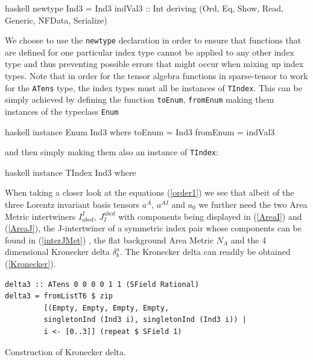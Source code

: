\documentclass[a4paper,12pt, DIV=14, BCOR=5mm, twoside, headsepline, numbers=noenddot]{scrbook}
\begin{document}
\begin{center}
\begin{cminted}{haskell}
newtype Ind3 =  Ind3 {indVal3 :: Int}
    deriving (Ord, Eq, Show, Read, Generic, NFData, Serialize)
\end{cminted}
\end{center}

We choose to use the \texttt{newtype} declaration in order to ensure that functions that are defined for one particular index type cannot be applied to any other index type and thus preventing possible errors that might occur when mixing up index types.
Note that in order for the tensor algebra functions in sparse-tensor to work for the \texttt{ATens} type, the index types must all be instances of \texttt{TIndex}. This can be simply achieved by defining the function \texttt{toEnum}, \texttt{fromEnum} making them instances of the typeclass \texttt{Enum} 

\begin{center}
\begin{cminted}{haskell}
instance Enum Ind3 where
    toEnum = Ind3
    fromEnum = indVal3
\end{cminted} 
\end{center}

and then simply making them also an instance of \texttt{TIndex}:

\begin{center}
\begin{cminted}{haskell}
instance TIndex Ind3 where
\end{cminted} 
\end{center}

When taking a closer look at the equations (\ref{order1}) we see that albeit of the three Lorentz invariant basis tensors $a^{A}$, $a^{AI}$ and $a_0$ we further need the two Area Metric intertwiners $I^I_{abcd}$, $J_I^{abcd}$ with components being displayed in (\ref{AreaI}) and (\ref{AreaJ}), the J-intertwiner of a symmetric index pair whose components can be found in (\ref{interJMet})  , the flat background Area Metric $N_A$ and the 4 dimensional Kronecker delta $\delta^a_b$. 
The Kronecker delta can readily be obtained (\ref{Kronecker}).

\begin{listing}[hbt!]
\begin{verbatim}
delta3 :: ATens 0 0 0 0 1 1 (SField Rational)
delta3 = fromListT6 $ zip
         [(Empty, Empty, Empty, Empty,
         singletonInd (Ind3 i), singletonInd (Ind3 i)) | 
         i <- [0..3]] (repeat $ SField 1)
\end{verbatim} 
\caption{Construction of Kronecker delta.}\label{Kronecker}
\end{listing}
\end{document}
